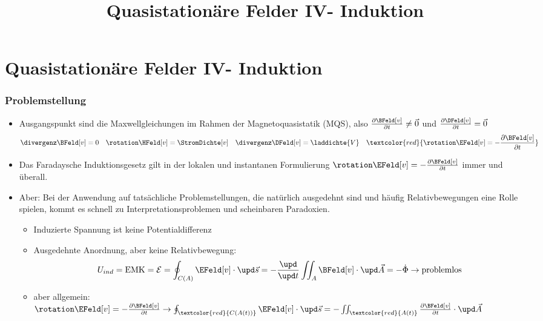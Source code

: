 
  
\title[TET: Quasistationäre Felder IV- Induktion]{Quasistationäre Felder IV- Induktion}


% 
% 

\maketitle

% 
% 
\section{Quasistationäre Felder IV- Induktion}

\begin{frame}
  \frametitle{Problemstellung}
  \begin{itemize}[<+->]
  \item Ausgangspunkt sind die Maxwellgleichungen im Rahmen der Magnetoquasistatik (MQS), also $\frac{\partial \BFeld[v]}{\partial t}\ne \vec{0}$ und $\frac{\partial \DFeld[v]}{\partial t} = \vec{0}$
    \begin{equation*}
      \divergenz \BFeld[v] = 0  \quad \rotation \HFeld[v] = \StromDichte[v] \quad 
      \divergenz \DFeld[v] = \laddichte{V}  \quad \textcolor{red}{\rotation \EFeld[v] = -\frac{\partial \BFeld[v]}{\partial t}} 
    \end{equation*}
  \item Das \alert{Faradaysche Induktionsgesetz} gilt in der \alert{lokalen und instantanen} Formulierung $\rotation \EFeld[v] = -\frac{\partial \BFeld[v]}{\partial t}$ \alert{immer und überall}.
  \item \alert{Aber:} Bei der Anwendung auf tatsächliche Problemstellungen, die natürlich \alert{ausgedehnt} sind und häufig \alert{Relativbewegungen} eine Rolle spielen, kommt es schnell zu Interpretationsproblemen und \alert{scheinbaren Paradoxien}.
    \begin{itemize}[<+->]
    \item Induzierte Spannung ist \alert{keine Potentialdifferenz}
    \item Ausgedehnte Anordnung, aber \alert{keine Relativbewegung}:
      $$
      U_{ind} = \text{EMK} = \mathcal{E}=\oint_{C(A)} \EFeld[v]\cdot\upd\vec{s} = - \frac{\upd }{\upd t} \iint_{A} \BFeld[v] \cdot \upd \vec{A} = -\dot{\Phi} \to \text{problemlos}
      $$
      \item aber allgemein: $\rotation \EFeld[v] = -\frac{\partial \BFeld[v]}{\partial t} \to \oint_{\textcolor{red}{C(A(t))}} \EFeld[v]\cdot\upd\vec{s} = -\iint_{\textcolor{red}{A(t)}} \frac{\partial \BFeld[v]}{\partial t} \cdot \upd \vec{A}$
    \end{itemize}
  \end{itemize}
\end{frame}


